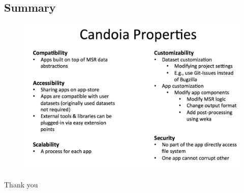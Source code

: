     \subsection{Summary}
        \begin{frame}
            \begin{figure}
                \centering
                    \includegraphics[scale=0.2]{figures/summary.png}
            \end{figure}
        \end{frame}



        \begin{frame}
            \centering
            Thank you
        \end{frame}


